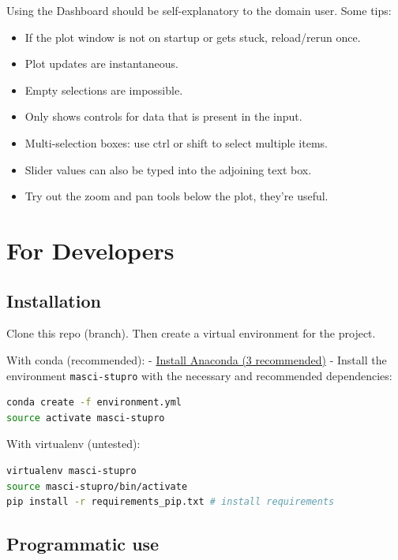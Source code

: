Using the Dashboard should be self-explanatory to the domain user. Some
tips:

\begin{itemize}
    \tightlist
\item If the plot window is not on startup or gets stuck, reload/rerun once.
\item Plot updates are instantaneous.
\item Empty selections are impossible.
\item Only shows controls for data that is present in the input.
\item Multi-selection boxes: use ctrl or shift to select multiple items. 
\item Slider values can also be typed into the adjoining text box.
\item Try out the zoom and pan tools below the plot, they're useful.
\end{itemize}

\section{For Developers}\label{for-developers}

\subsection{Installation}\label{installation-1}

Clone this repo (branch). Then create a virtual environment for the project.

With conda (recommended): -
\href{https://www.anaconda.com/download}{Install Anaconda (3
  recommended)} - Install the environment \texttt{masci-stupro} with the
necessary and recommended dependencies:

\begin{lstlisting}[language=bash, style=code]
conda create -f environment.yml
source activate masci-stupro
\end{lstlisting}

With virtualenv (untested):

\begin{lstlisting}[language=bash, style=code]
virtualenv masci-stupro
source masci-stupro/bin/activate
pip install -r requirements_pip.txt # install requirements
\end{lstlisting}

\subsection{Programmatic use}\label{using-the-backend}

